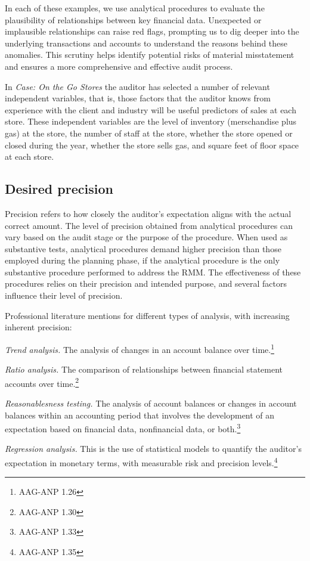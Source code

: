 \bigskip
In each of these examples, we use analytical procedures to evaluate the plausibility of relationships between key financial data. Unexpected or implausible relationships can raise red flags, prompting us to dig deeper into the underlying transactions and accounts to understand the reasons behind these anomalies. This scrutiny helps identify potential risks of material misstatement and ensures a more comprehensive and effective audit process.

In \textit{Case: On the Go Stores} the auditor has selected a number of relevant independent variables, that is, those factors that the auditor knows from experience with the client and industry will be useful predictors of sales at each store. These independent variables are the level of inventory (merschandise plus gas) at the store, the number of staff at the store, whether the store opened or closed during the year, whether the store sells gas, and square feet of floor space at each store.


\subsection{Desired precision} %
\label{sub:desired_precision}

Precision refers to how closely the auditor's expectation aligns with the actual correct amount. The level of precision obtained from analytical procedures can vary based on the audit stage or the purpose of the procedure. When used as substantive tests, analytical procedures demand higher precision than those employed during the planning phase, if the analytical procedure is the only substantive procedure performed to address the RMM. The effectiveness of these procedures relies on their precision and intended purpose, and several factors influence their level of precision.

Professional literature mentions for different types of analysis, with increasing inherent precision:
\begin{compactitem}
	\item \textit{Trend analysis.} The analysis of changes in an account balance over time.\footnote{AAG-ANP 1.26}
	\item \textit{Ratio analysis.} The comparison of relationships between financial statement accounts over time.\footnote{AAG-ANP 1.30}
	\item \textit{Reasonablesness testing.} The analysis of account balances or changes in account balances within an accounting period that involves the development of an expectation based on financial data, nonfinancial data, or both.\footnote{AAG-ANP 1.33}
	\item \textit{Regression analysis.} This is the use of statistical models to quantify the auditor's expectation in monetary terms, with measurable risk and precision levels.\footnote{AAG-ANP 1.35}
\end{compactitem}

